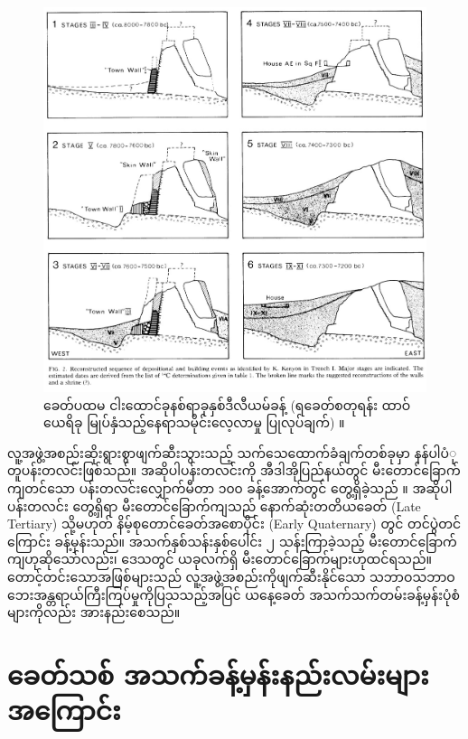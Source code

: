 \documentclass[10pt,twocolumn,letterpaper]{article}
\begin{document}
\begin{figure}[t]
\begin{center}

\includegraphics[width=1\linewidth]{jericho.jpg}
\end{center}
   \caption{ခေတ်ပထမ ငါးထောင်ခုနစ်ရာခုနှစ်ဒီလီယမ်ခန့် (ရခေတ်စတုရန်း ထာဝ်ယေရိခု မြုပ်နှံသည့်နေရာသမိုင်းလေ့လာမှု ပြုလုပ်ချက်) \cite{95}။}
\label{fig:14}
\label{fig:onecol}
\end{figure}

လူ့အဖွဲ့အစည်းဆိုးရွားစွာဖျက်ဆီးသွားသည့် သက်သေထောက်ခံချက်တစ်ခုမှာ နန်ပါပံုတူပန်းတလင်းဖြစ်သည်။ အဆိုပါပန်းတလင်းကို အီဒါအိုပြည်နယ်တွင် မီးတောင်ခြောက်ကျတင်သော ပန်းတလင်းလျှောက်မီတာ ၁၀၀ ခန့်အောက်တွင် တွေ့ရှိခဲ့သည် \cite{102,103}။ အဆိုပါပန်းတလင်း တွေ့ရှိရာ မီးတောင်ခြောက်ကျသည် နောက်ဆုံးတတိယခေတ် (Late Tertiary) သို့မဟုတ် နိမ့်စုတောင်ခေတ်အစောပိုင်း (Early Quaternary) တွင် တင်ပွဲတင်ကြောင်း ခန့်မှန်းသည်။ အသက်နှစ်သန်းနှစ်ပေါင်း ၂ သန်းကြာခဲ့သည့် မီးတောင်ခြောက်ကျဟုဆိုသော်လည်း၊ ဒေသတွင် ယခုလက်ရှိ မီးတောင်ခြောက်များဟုထင်ရသည်။ တောင့်တင်းသောအဖြစ်များသည် လူ့အဖွဲ့အစည်းကိုဖျက်ဆီးနိုင်သော သဘာဝသဘာဝဘေးအန္တရာယ်ကြီးကြပ်မှုကိုပြသသည့်အပြင် ယနေ့ခေတ် အသက်သက်တမ်းခန့်မှန်းပုံစံများကိုလည်း အားနည်းစေသည်။

\section{ခေတ်သစ် အသက်ခန့်မှန်းနည်းလမ်းများအကြောင်း}
\end{document}
